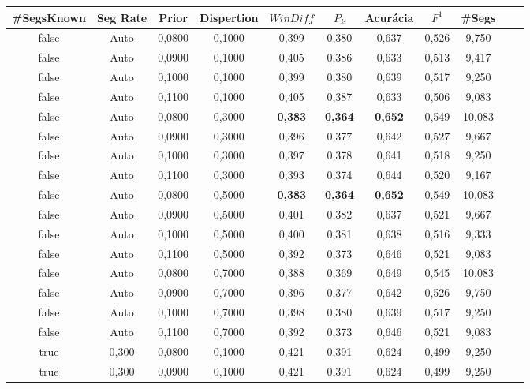\documentclass{article}
\begin{document}
\begin{longtable}[c]{|c|c|c|c|c|c|c|c|c|c|c|} 
\hline 
 \#SegsKnown & Seg Rate & Prior & Dispertion & $WinDiff$ & $P_k$ & Acurácia & $F^1$ & \#Segs\\ \hline 
 false & Auto & 0,0800 & 0,1000 & 0,399 & 0,380 & 0,637 & 0,526 & 9,750  \\ \hline 
 false & Auto & 0,0900 & 0,1000 & 0,405 & 0,386 & 0,633 & 0,513 & 9,417  \\ \hline 
 false & Auto & 0,1000 & 0,1000 & 0,399 & 0,380 & 0,639 & 0,517 & 9,250  \\ \hline 
 false & Auto & 0,1100 & 0,1000 & 0,405 & 0,387 & 0,633 & 0,506 & 9,083  \\ \hline 
 false & Auto & 0,0800 & 0,3000 & \cellcolor{gray!20} \textbf{0,383} & \cellcolor{gray!20} \textbf{0,364} & \cellcolor{gray!20} \textbf{0,652} & 0,549 & 10,083  \\ \hline 
 false & Auto & 0,0900 & 0,3000 & 0,396 & 0,377 & 0,642 & 0,527 & 9,667  \\ \hline 
 false & Auto & 0,1000 & 0,3000 & 0,397 & 0,378 & 0,641 & 0,518 & 9,250  \\ \hline 
 false & Auto & 0,1100 & 0,3000 & 0,393 & 0,374 & 0,644 & 0,520 & 9,167  \\ \hline 
 false & Auto & 0,0800 & 0,5000 & \cellcolor{gray!20} \textbf{0,383} & \cellcolor{gray!20} \textbf{0,364} & \cellcolor{gray!20} \textbf{0,652} & 0,549 & 10,083  \\ \hline 
 false & Auto & 0,0900 & 0,5000 & 0,401 & 0,382 & 0,637 & 0,521 & 9,667  \\ \hline 
 false & Auto & 0,1000 & 0,5000 & 0,400 & 0,381 & 0,638 & 0,516 & 9,333  \\ \hline 
 false & Auto & 0,1100 & 0,5000 & 0,392 & 0,373 & 0,646 & 0,521 & 9,083  \\ \hline 
 false & Auto & 0,0800 & 0,7000 & 0,388 & 0,369 & 0,649 & 0,545 & 10,083  \\ \hline 
 false & Auto & 0,0900 & 0,7000 & 0,396 & 0,377 & 0,642 & 0,526 & 9,750  \\ \hline 
 false & Auto & 0,1000 & 0,7000 & 0,398 & 0,380 & 0,639 & 0,517 & 9,250  \\ \hline 
 false & Auto & 0,1100 & 0,7000 & 0,392 & 0,373 & 0,646 & 0,521 & 9,083  \\ \hline 
 true & 0,300 & 0,0800 & 0,1000 & 0,421 & 0,391 & 0,624 & 0,499 & 9,250  \\ \hline 
 true & 0,300 & 0,0900 & 0,1000 & 0,421 & 0,391 & 0,624 & 0,499 & 9,250  \\ \hline 

\end{longtable}
\end{document}

